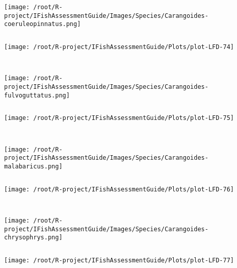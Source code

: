 \begin{knitrout}
\begin{kframe}
\begin{verbatim}
\end{verbatim}
\end{kframe}
\texttt{[image: /root/R-project/IFishAssessmentGuide/Images/Species/Carangoides-coeruleopinnatus.png]}
\begin{kframe}\begin{verbatim}
\end{verbatim}
\end{kframe}
\texttt{[image: /root/R-project/IFishAssessmentGuide/Plots/plot-LFD-74]} 
\begin{kframe}\begin{verbatim}
 
\end{verbatim}
\end{kframe}
\texttt{[image: /root/R-project/IFishAssessmentGuide/Images/Species/Carangoides-fulvoguttatus.png]}
\begin{kframe}\begin{verbatim}
\end{verbatim}
\end{kframe}
\texttt{[image: /root/R-project/IFishAssessmentGuide/Plots/plot-LFD-75]} 
\begin{kframe}\begin{verbatim}
 
\end{verbatim}
\end{kframe}
\texttt{[image: /root/R-project/IFishAssessmentGuide/Images/Species/Carangoides-malabaricus.png]}
\begin{kframe}\begin{verbatim}
\end{verbatim}
\end{kframe}
\texttt{[image: /root/R-project/IFishAssessmentGuide/Plots/plot-LFD-76]} 
\begin{kframe}\begin{verbatim}
 
\end{verbatim}
\end{kframe}
\texttt{[image: /root/R-project/IFishAssessmentGuide/Images/Species/Carangoides-chrysophrys.png]}
\begin{kframe}\begin{verbatim}
\end{verbatim}
\end{kframe}
\texttt{[image: /root/R-project/IFishAssessmentGuide/Plots/plot-LFD-77]} 
\begin{kframe}\begin{verbatim}
 

\end{verbatim}
\end{kframe}
\end{knitrout}
